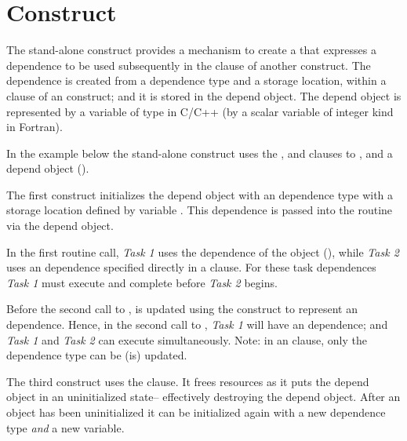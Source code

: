 \pagebreak
\section{ Construct}
\label{sec:depobj}

The stand-alone  construct provides a mechanism 
to create a  that expresses a dependence to be 
used subsequently in the  clause of another construct.
The dependence is created from a dependence type and a storage location,
within a  clause of an  construct; 
and it is stored in the depend object.
The depend object is represented by a variable of type  
in C/C++ (by a scalar variable of integer kind  in Fortran).

In the example below the stand-alone  construct uses the 
,  and  clauses to 
,  and 
a depend object ().

The first  construct initializes the  
depend object with 
an  dependence type with a storage 
location defined by variable .  
This dependence is passed into the  
routine via the  depend object.

In the first  routine call, \emph{Task 1} uses
the dependence of the object (), 
while \emph{Task 2} uses an  dependence specified 
directly in a  clause.
For these task dependences \emph{Task 1} must execute and 
complete before \emph{Task 2} begins.

Before the second call to ,  is updated 
using the  construct to represent an  dependence. 
Hence, in the second call to , \emph{Task 1}
will have an  dependence; and \emph{Task 1} and 
\emph{Task 2} can execute simultaneously. Note: in an 
clause, only the dependence type can be (is) updated.

The third  construct uses the  clause.
It frees resources as it puts the depend object in an uninitialized state--
effectively destroying the depend object.
After an object has been uninitialized it can be initialized again
with a new dependence type \emph{and} a new variable.


